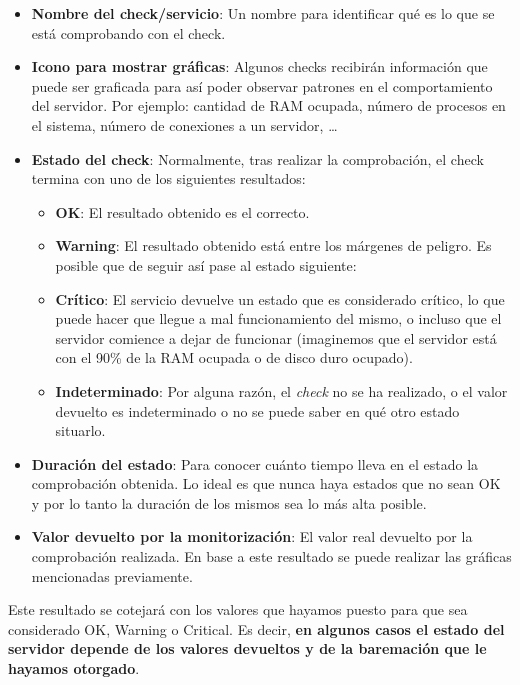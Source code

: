 \begin{itemize}
    \item \textbf{Nombre del check/servicio}: Un nombre para identificar qué es lo que se está comprobando con el check.
    \item \textbf{Icono para mostrar gráficas}: Algunos checks recibirán información que puede ser graficada para así poder observar patrones en el comportamiento del servidor. Por ejemplo: cantidad de RAM ocupada, número de procesos en el sistema, número de conexiones a un servidor, …
    \item \textbf{Estado del check}: Normalmente, tras realizar la comprobación, el check termina con uno de los siguientes resultados:
    \begin{itemize}
        \item \textbf{OK}: El resultado obtenido es el correcto.
        \item \textbf{Warning}: El resultado obtenido está entre los márgenes de peligro. Es posible que de seguir así pase al estado siguiente:
        \item \textbf{Crítico}: El servicio devuelve un estado que es considerado crítico, lo que puede hacer que llegue a mal funcionamiento del mismo, o incluso que el servidor comience a dejar de funcionar (imaginemos que el servidor está con el 90\% de la RAM ocupada o de disco duro ocupado).
        \item \textbf{Indeterminado}: Por alguna razón, el \textit{check} no se ha realizado, o el valor devuelto es indeterminado o no se puede saber en qué otro estado situarlo.
    \end{itemize}
    \item \textbf{Duración del estado}: Para conocer cuánto tiempo lleva en el estado la comprobación obtenida. Lo ideal es que nunca haya estados que no sean OK y por lo tanto la duración de los mismos sea lo más alta posible.
    \item \textbf{Valor devuelto por la monitorización}: El valor real devuelto por la comprobación realizada. En base a este resultado se puede realizar las gráficas mencionadas previamente.
\end{itemize}


Este resultado se cotejará con los valores que hayamos puesto para que sea considerado OK, Warning o Critical. Es decir, \textbf{en algunos casos el estado del servidor depende de los valores devueltos y de la baremación que le hayamos otorgado}.

